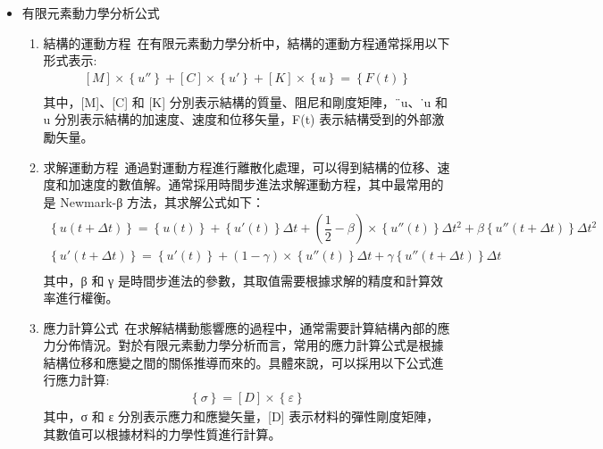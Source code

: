 \begin{itemize}

\item 有限元素動力學分析公式


\begin{enumerate}
\item 結構的運動方程\
在有限元素動力學分析中，結構的運動方程通常採用以下形式表示:\\
\[
\begin{aligned}
\left[ M\right] \times \left\{ u''\right\} +\left[ C\right] \times \left\{ u'\right\} +\left[ K\right] \times \left\{ u\right\} =\left\{ F\left( t\right) \right\}\\
\end{aligned}
\]
其中，[M]、[C] 和 [K] 分別表示結構的質量、阻尼和剛度矩陣，{¨u}、{˙u} 和 {u} 分別表示結構的加速度、速度和位移矢量，{F(t)} 表示結構受到的外部激勵矢量。\\

\item 求解運動方程\
通過對運動方程進行離散化處理，可以得到結構的位移、速度和加速度的數值解。通常採用時間步進法求解運動方程，其中最常用的是 Newmark-β 方法，其求解公式如下：\\
\[
\begin{aligned}
\left\{ u\left( t+\Delta t\right) \right\} =\left\{ u\left( t\right) \right\} +\left\{ u'\left( t\right) \right\} \Delta t+\left( \dfrac{1}{2}-\beta \right) \times \left\{ u''\left( t\right) \right\} \Delta t^{2}+\beta \left\{ u''\left( t+\Delta t\right) \right\} \Delta t^{2}\\
\left\{ u'\left( t+\Delta t\right) \right\} =\left\{ u'\left( t\right) \right\} +\left( 1-\gamma \right) \times \left\{ u''\left( t\right) \right\} \Delta t+\gamma \left\{ u''\left( t+\Delta t\right) \right\} \Delta t\\
\end{aligned}
\]
其中，β 和 γ 是時間步進法的參數，其取值需要根據求解的精度和計算效率進行權衡。\\

\item 應力計算公式\
在求解結構動態響應的過程中，通常需要計算結構內部的應力分佈情況。對於有限元素動力學分析而言，常用的應力計算公式是根據結構位移和應變之間的關係推導而來的。具體來說，可以採用以下公式進行應力計算:\\
\[
\begin{aligned}
\left\{ \sigma \right\} =\left[ D\right] \times \left\{ \varepsilon \right\}
\end{aligned}
\]
其中，{σ} 和 {ε} 分別表示應力和應變矢量，[D] 表示材料的彈性剛度矩陣，其數值可以根據材料的力學性質進行計算。


\end{enumerate}
\end{itemize}

